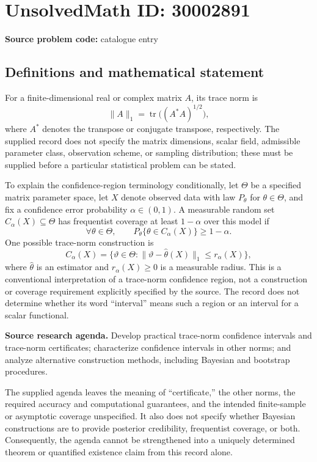 \documentclass[11pt]{article}
\begin{document}
\section*{UnsolvedMath ID: 30002891}
\textbf{Source problem code:} catalogue entry
\subsection{Definitions and mathematical statement}
For a finite-dimensional real or complex matrix \(A\), its trace norm is
\[
\|A\|_1=\operatorname{tr}\bigl((A^*A)^{1/2}\bigr),
\]
where \(A^*\) denotes the transpose or conjugate transpose, respectively. The supplied record does not specify the matrix dimensions, scalar field, admissible parameter class, observation scheme, or sampling distribution; these must be supplied before a particular statistical problem can be stated.

To explain the confidence-region terminology conditionally, let \(\Theta\) be a specified matrix parameter space, let \(X\) denote observed data with law \(P_\theta\) for \(\theta\in\Theta\), and fix a confidence error probability \(\alpha\in(0,1)\). A measurable random set \(C_\alpha(X)\subseteq\Theta\) has frequentist coverage at least \(1-\alpha\) over this model if
\[
\forall\theta\in\Theta,\qquad
P_\theta\{\theta\in C_\alpha(X)\}\geq 1-\alpha.
\]
One possible trace-norm construction is
\[
C_\alpha(X)=\{\vartheta\in\Theta:
\|\vartheta-\widehat\theta(X)\|_1\leq r_\alpha(X)\},
\]
where \(\widehat\theta\) is an estimator and \(r_\alpha(X)\geq0\) is a measurable radius. This is a conventional interpretation of a trace-norm confidence region, not a construction or coverage requirement explicitly specified by the source. The record does not determine whether its word ``interval'' means such a region or an interval for a scalar functional.

\textbf{Source research agenda.} Develop practical trace-norm confidence intervals and trace-norm certificates; characterize confidence intervals in other norms; and analyze alternative construction methods, including Bayesian and bootstrap procedures.

The supplied agenda leaves the meaning of ``certificate,'' the other norms, the required accuracy and computational guarantees, and the intended finite-sample or asymptotic coverage unspecified. It also does not specify whether Bayesian constructions are to provide posterior credibility, frequentist coverage, or both. Consequently, the agenda cannot be strengthened into a uniquely determined theorem or quantified existence claim from this record alone.
\end{document}

